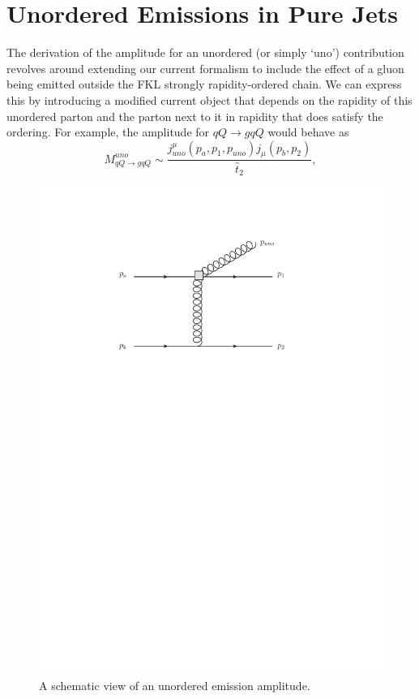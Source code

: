 \section{Unordered Emissions in Pure Jets}
The derivation of the amplitude for an unordered (or simply `uno') contribution revolves around extending our current formalism to include the effect of a gluon being emitted outside the FKL strongly rapidity-ordered chain. We can express this by introducing a modified current object that depends on the rapidity of this unordered parton and the parton next to it in rapidity that does satisfy the ordering. For example, the amplitude for $qQ \to gqQ$ would behave as
\begin{equation}
M_{qQ \to gqQ}^{uno} \sim \frac{j^\mu_{uno}(p_a,p_1,p_{uno})j_\mu(p_b,p_2)}{\hat{t}_2},
\label{eqn:uno}
\end{equation}
\begin{figure}[t]
\centering
\includegraphics[scale=0.7]{Images/uno.pdf}
\caption{A schematic view of an unordered emission amplitude.}
\label{fig:uno}
\end{figure}

